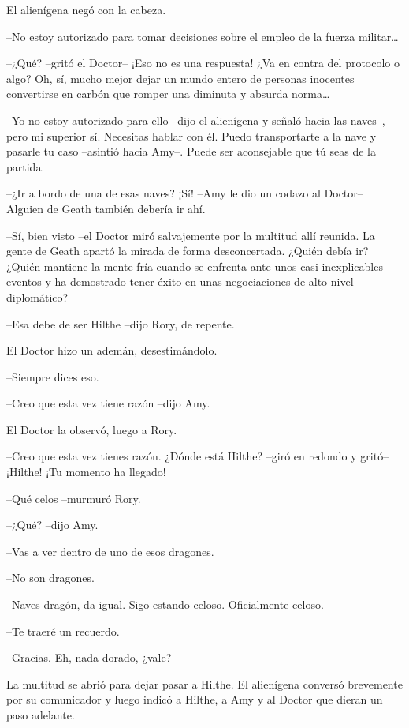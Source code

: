 {El alienígena negó con la cabeza.}

{--No estoy autorizado para tomar decisiones sobre el empleo de la
	fuerza militar\ldots{}}

{--¿Qué? --gritó el Doctor-- ¡Eso no es una respuesta! ¿Va en contra
	del protocolo o algo? Oh, sí, mucho mejor dejar un mundo entero de
	personas inocentes convertirse en carbón que romper una diminuta y
	absurda norma\ldots{}}

{--Yo no estoy autorizado para ello --dijo el alienígena y señaló
	hacia las naves--, pero mi superior sí. Necesitas hablar con él. Puedo
	transportarte a la nave y pasarle tu caso --asintió hacia Amy--. Puede
ser aconsejable que tú seas de la partida.}

{--¿Ir a bordo de una de esas naves? ¡Sí! --Amy le dio un codazo al
Doctor-- Alguien de Geath también debería ir ahí.}

{--Sí, bien visto --el Doctor miró salvajemente por la multitud allí
	reunida. La gente de Geath apartó la mirada de forma desconcertada.
	¿Quién debía ir? ¿Quién mantiene la mente fría cuando se enfrenta ante
	unos casi inexplicables eventos y ha demostrado tener éxito en unas
negociaciones de alto nivel diplomático?}

{--Esa debe de ser Hilthe --dijo Rory, de repente.}

{El Doctor hizo un ademán, desestimándolo.}

{--Siempre dices eso.}

{--Creo que esta vez tiene razón --dijo Amy.}

{El Doctor la observó, luego a Rory.}

{--Creo que esta vez tienes razón. ¿Dónde está Hilthe? --giró en
redondo y gritó-- ¡Hilthe! ¡Tu momento ha llegado!}

{--Qué celos --murmuró Rory.}

{--¿Qué? --dijo Amy.}

{--Vas a ver dentro de uno de esos dragones.}

{--No son dragones.}

{--Naves-dragón, da igual. Sigo estando celoso. Oficialmente celoso.}

{--Te traeré un recuerdo.}

{--Gracias. Eh, nada dorado, ¿vale?}

{La multitud se abrió para dejar pasar a Hilthe. El alienígena conversó
	brevemente por su comunicador y luego indicó a Hilthe, a Amy y al Doctor
que dieran un paso adelante.}

